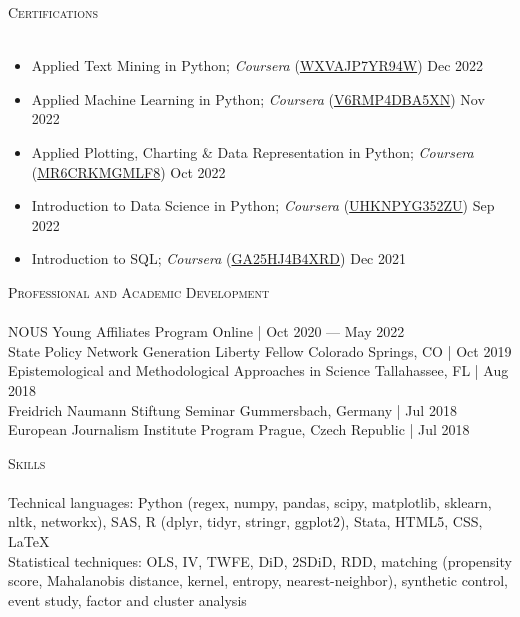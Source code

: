 \documentclass[a4paper,11pt]{article}
\newcommand{\lineunder} {
    \vspace*{-8pt} \\
    \hspace*{-18pt} \hrulefill \\
}
\newcommand{\header} [1] {
    {\hspace*{-18pt}\vspace*{6pt} \textsc{\large{#1}}}
    \vspace*{-6pt} \lineunder
}
\begin{document}
\vspace{1mm}
\header{Certifications}
\begin{itemize}
    \item Applied Text Mining in Python; \emph{Coursera} (\href{https://www.coursera.org/account/accomplishments/verify/WXVAJP7YR94W}{WXVAJP7YR94W}) \hfill Dec 2022
    \item Applied Machine Learning in Python; \emph{Coursera} (\href{https://www.coursera.org/account/accomplishments/certificate/V6RMP4DBA5XN}{V6RMP4DBA5XN}) \hfill Nov 2022
    \item Applied Plotting, Charting \& Data Representation in Python; \emph{Coursera} (\href{https://www.coursera.org/account/accomplishments/certificate/MR6CRKMGMLF8}{MR6CRKMGMLF8}) \hfill Oct 2022
    \item Introduction to Data Science in Python; \emph{Coursera} (\href{https://www.coursera.org/account/accomplishments/certificate/UHKNPYG352ZU}{UHKNPYG352ZU}) \hfill Sep 2022
    \item Introduction to SQL; \emph{Coursera} (\href{https://coursera.org/verify/GA25HJ4B4XRD}{GA25HJ4B4XRD}) \hfill Dec 2021
\end{itemize}
\vspace{1mm}
\header{Professional and Academic Development}

NOUS Young Affiliates Program \hfill Online | Oct 2020 --- May 2022 \\

State Policy Network Generation Liberty Fellow \hfill Colorado Springs, CO | Oct 2019 \\

Epistemological and Methodological Approaches in Science \hfill Tallahassee, FL | Aug 2018\\

Freidrich Naumann Stiftung Seminar \hfill Gummersbach, Germany | Jul 2018\\

European Journalism Institute Program \hfill Prague, Czech Republic | Jul 2018 \\

\vspace{1mm}
\header{Skills}
Technical languages: Python (regex, numpy, pandas, scipy, matplotlib, sklearn, nltk, networkx), SAS, R (dplyr, tidyr, stringr, ggplot2), Stata, HTML5, CSS, \LaTeX \\

Statistical techniques: OLS, IV, TWFE, DiD, 2SDiD, RDD, matching (propensity score, Mahalanobis distance, kernel, entropy, nearest-neighbor), synthetic control, event study, factor and cluster analysis
\end{document}
